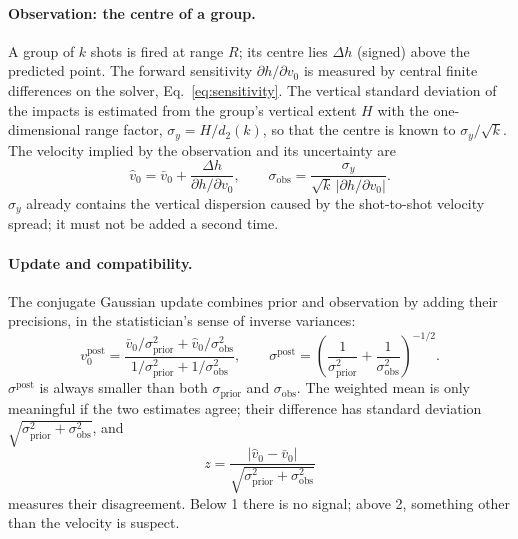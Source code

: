 \documentclass[11pt,twoside,openright]{report}
\begin{document}
\paragraph{Observation: the centre of a group.} A group of $k$ shots is fired at range $R$; its centre lies $\Delta h$ (signed) above the predicted point. The forward sensitivity $\partial h/\partial v_0$ is measured by central finite differences on the solver, Eq.~\eqref{eq:sensitivity}. The vertical standard deviation of the impacts is estimated from the group's vertical extent $H$ with the one-dimensional range factor, $\sigma_y = H/d_2(k)$, so that the centre is known to $\sigma_y/\sqrt{k}$. The velocity implied by the observation and its uncertainty are
\begin{equation}
  \hat{v}_0 = \bar{v}_0 + \frac{\Delta h}{\partial h/\partial v_0},
  \qquad
  \sigma_{\text{obs}} = \frac{\sigma_y}{\sqrt{k}\,\left|\partial h/\partial v_0\right|}.
\end{equation}
$\sigma_y$ already contains the vertical dispersion caused by the shot-to-shot velocity spread; it must not be added a second time.

\paragraph{Update and compatibility.} The conjugate Gaussian update combines prior and observation by adding their precisions, in the statistician's sense of inverse variances:
\begin{equation}
  v_0^{\text{post}} = \frac{\bar{v}_0/\sigma_{\text{prior}}^2 + \hat{v}_0/\sigma_{\text{obs}}^2}{1/\sigma_{\text{prior}}^2 + 1/\sigma_{\text{obs}}^2},
  \qquad
  \sigma^{\text{post}} = \left(\frac{1}{\sigma_{\text{prior}}^2} + \frac{1}{\sigma_{\text{obs}}^2}\right)^{-1/2}.
  \label{eq:truing}
\end{equation}
$\sigma^{\text{post}}$ is always smaller than both $\sigma_{\text{prior}}$ and $\sigma_{\text{obs}}$. The weighted mean is only meaningful if the two estimates agree; their difference has standard deviation $\sqrt{\sigma_{\text{prior}}^2 + \sigma_{\text{obs}}^2}$, and
\begin{equation}
  z = \frac{\left|\hat{v}_0 - \bar{v}_0\right|}{\sqrt{\sigma_{\text{prior}}^2 + \sigma_{\text{obs}}^2}}
\end{equation}
measures their disagreement. Below 1 there is no signal; above 2, something other than the velocity is suspect.
\end{document}
